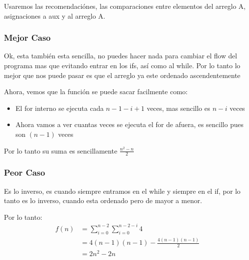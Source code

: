 \documentclass[12pt, fleqn]{article}                            %
\theoremstyle{break}                                            %
\begin{document}
        Usaremos las recomendaciónes, las comparaciones entre elementos del arreglo A, asignaciones
        a aux y al arreglo A.

        \subsubsection{Mejor Caso}

            Ok, esta también esta sencilla, no puedes hacer nada para cambiar el flow del programa
            mas que evitando entrar en los ifs, así como al while.
            Por lo tanto lo mejor que nos puede pasar es que el arreglo ya este ordenado ascendentemente

            Ahora, vemos que la función se puede sacar facilmente como:
            \begin{itemize}
                \item El for interno se ejecuta cada $n-1 - i + 1$ veces, mas sencillo
                es $n - i$ veces
                \item Ahora vamos a ver cuantas veces se ejecuta el for de afuera, es sencillo
                pues son $(n-1)$ veces 
            \end{itemize}

            Por lo tanto su suma es sencillamente $\frac{n^2 - n}{2}$



        \subsubsection{Peor Caso}


            Es lo inverso, es cuando siempre entramos en el while y siempre en el if, por lo tanto
            es lo inverso, cuando esta ordenado pero de mayor a menor.

            Por lo tanto:
            \begin{align*}
                f(n)
                    &= \sum_{i = 0}^{n - 2} \sum_{i = 0}^{n - 2 - i} 4      \\
                    &= 4(n-1)(n-1) - \frac{4(n-1)(n-1)}{2}                  \\
                    &= 2n^2 - 2n 
            \end{align*}
\end{document}
